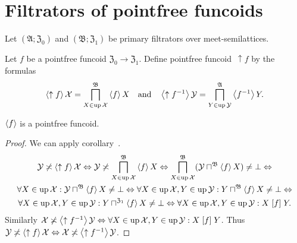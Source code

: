 \chapter{Filtrators of pointfree funcoids}

Let $(\mathfrak{A};\mathfrak{Z}_0)$ and $(\mathfrak{B};\mathfrak{Z}_1)$ be primary filtrators over meet-semilattices.

Let $f$ be a pointfree funcoid $\mathfrak{Z}_0\rightarrow\mathfrak{Z}_1$. Define pointfree funcoid~$\uparrow f$
by the formulas
\[
\left\langle \uparrow f\right\rangle \mathcal{X} = \bigsqcap^{\mathfrak{B}}_{X\in\operatorname{up}\mathcal{X}} \left\langle f\right\rangle X \quad\text{and}\quad
\left\langle \uparrow f^{-1}\right\rangle \mathcal{Y} = \bigsqcap^{\mathfrak{A}}_{Y\in\operatorname{up}\mathcal{Y}} \left\langle f^{-1}\right\rangle Y.
\]

\begin{prop}
$\left\langle f\right\rangle$ is a pointfree funcoid.
\end{prop}

\begin{proof}
We can apply corollary~.
\begin{multline*}
\mathcal{Y} \not\asymp \left\langle \uparrow f\right\rangle \mathcal{X} \Leftrightarrow
\mathcal{Y} \not\asymp \bigsqcap^{\mathfrak{B}}_{X\in\operatorname{up}\mathcal{X}} \left\langle f\right\rangle X \Leftrightarrow
\bigsqcap^{\mathfrak{B}}_{X\in\operatorname{up}\mathcal{X}} (\mathcal{Y} \sqcap^{\mathfrak{B}} \left\langle f\right\rangle X) \ne \bot \Leftrightarrow \\
\forall X\in\operatorname{up}\mathcal{X}: \mathcal{Y} \sqcap^{\mathfrak{B}} \left\langle f\right\rangle X \ne \bot \Leftrightarrow
\forall X\in\operatorname{up}\mathcal{X}, Y\in\operatorname{up}\mathcal{Y}: Y \sqcap^{\mathfrak{B}} \left\langle f\right\rangle X \ne \bot \Leftrightarrow \\
\forall X\in\operatorname{up}\mathcal{X}, Y\in\operatorname{up}\mathcal{Y}: Y \sqcap^{\mathfrak{Z}_1} \left\langle f\right\rangle X \ne \bot \Leftrightarrow
\forall X\in\operatorname{up}\mathcal{X}, Y\in\operatorname{up}\mathcal{Y}: X\mathrel{\left[f\right]}Y.
\end{multline*}
Similarly $\mathcal{X} \not\asymp \left\langle \uparrow f^{-1}\right\rangle \mathcal{Y} \Leftrightarrow
\forall X\in\operatorname{up}\mathcal{X}, Y\in\operatorname{up}\mathcal{Y}: X\mathrel{\left[f\right]}Y$.
Thus $\mathcal{Y} \not\asymp \left\langle \uparrow f\right\rangle \mathcal{X} \Leftrightarrow \mathcal{X} \not\asymp \left\langle \uparrow f^{-1}\right\rangle \mathcal{Y}$.
\end{proof}
